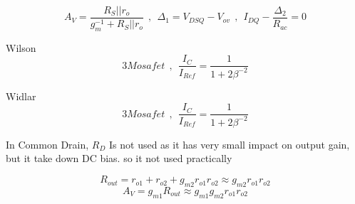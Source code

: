 $$ A_V = \dfrac{R_S || r_o}{g_m^{-1} + R_S||r_o} ~~ , ~~  {\Delta}_1 = V_{DSQ} - V_{ov} ~~ , ~~ I_{DQ} - \frac{{\Delta}_2}{R_{ac}} = 0 $$
\par
Wilson
$$ 3 Mosafet ~~ , ~~ \frac{I_C}{I_{Ref}} = \frac{1}{1 + 2 \beta ^ {-2}} $$
\par
Widlar
$$ 3 Mosafet ~~ , ~~ \frac{I_C}{I_{Ref}} = \frac{1}{1 + 2 \beta ^ {-2}} $$
\par
\setlength{\parindent}{0.5cm} %
In Common Drain, $R_D$ Is not used as it has very small impact on output gain, but it take down DC bias. so it not used practically
\lipsum[1-4]
\setlength{\parindent}{0.0cm} 
\begin{minipage}[b]{.5\textwidth}
$$ R_{out} = r_{o1} + r_{o2} + g_{m2} r_{o1} r_{o2} \approx g_{m2} r_{o1} r_{o2} $$
$$ A_V = g_{m1} R_{out} \approx g_{m1} g_{m2} r_{o1} r_{o2}$$
\par ~\\
\centering

\end{minipage}%
\noindent
\setlength{\parindent}{0.0cm} 
\hspace*{-\parindent}%
\begin{minipage}[b]{.5\textwidth}
\raggedleft

\end{minipage}%
